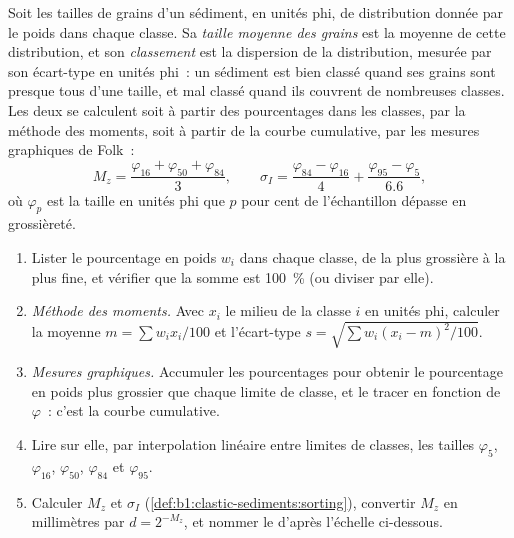 \begin{definition}\label{def:b1:clastic-sediments:sorting}
Soit les tailles de grains d'un sédiment, en unités phi, de distribution donnée par
le poids dans chaque classe. Sa \emph{taille moyenne des grains} est
la moyenne de cette distribution, et son \emph{classement} est la
dispersion de la distribution, mesurée par son écart-type en unités phi~: un
sédiment est bien classé quand ses grains sont presque tous d'une taille, et mal
classé quand ils couvrent de nombreuses classes. Les deux se calculent soit à partir des
pourcentages dans les classes, par la méthode des moments, soit à partir de la courbe
cumulative, par les mesures graphiques de Folk~:
\[
  M_z = \frac{\varphi_{16} + \varphi_{50} + \varphi_{84}}{3}, \qquad
  \sigma_I = \frac{\varphi_{84} - \varphi_{16}}{4} + \frac{\varphi_{95} - \varphi_{5}}{6.6},
\]
où $\varphi_p$ est la taille en unités phi que $p$ pour cent de l'échantillon
dépasse en grossièreté.
\end{definition}

\begin{method}\label{met:b1:clastic-sediments:graphic}
\begin{enumerate}
  \item Lister le pourcentage en poids $w_i$ dans chaque classe, de la plus grossière à la
        plus fine, et vérifier que la somme est \qty{100}{\percent} (ou diviser par elle).
  \item \emph{Méthode des moments.} Avec $x_i$ le milieu de la classe $i$ en unités
        phi, calculer la moyenne $m = \sum w_i x_i / 100$ et l'écart-type
        $s = \sqrt{\sum w_i (x_i - m)^2 / 100}$.
  \item \emph{Mesures graphiques.} Accumuler les pourcentages pour obtenir le pourcentage
        en poids plus grossier que chaque limite de classe, et le tracer en fonction de $\varphi$~:
        c'est la courbe cumulative.
  \item Lire sur elle, par interpolation linéaire entre limites de classes, les tailles
        $\varphi_5$, $\varphi_{16}$, $\varphi_{50}$, $\varphi_{84}$ et
        $\varphi_{95}$.
  \item Calculer $M_z$ et $\sigma_I$ (\cref{def:b1:clastic-sediments:sorting}),
        convertir $M_z$ en millimètres par $d = 2^{-M_z}$, et nommer le 
        d'après l'échelle ci-dessous.
\end{enumerate}
\end{method}

